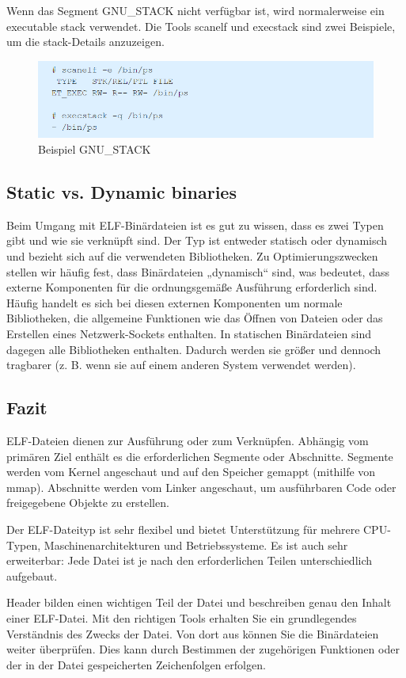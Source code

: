 Wenn das Segment GNU\_STACK nicht verfügbar ist, wird normalerweise ein executable stack verwendet.
Die Tools scanelf und execstack sind zwei Beispiele, um die stack-Details anzuzeigen.

\begin{figure}[H]
    \begin{center}
        \includegraphics[scale=1]{images/example_gnustack.png}
        \caption{Beispiel GNU\_STACK \cite{example_gnustack}}
    \end{center}
\end{figure}

\subsection{Static vs. Dynamic binaries}
Beim Umgang mit ELF-Binärdateien ist es gut zu wissen, dass es zwei Typen gibt und wie sie verknüpft sind. Der Typ ist entweder statisch oder dynamisch und bezieht sich auf die verwendeten Bibliotheken. Zu Optimierungszwecken stellen wir häufig fest, dass Binärdateien „dynamisch“ sind, was bedeutet, dass externe Komponenten für die ordnungsgemäße Ausführung erforderlich sind. Häufig handelt es sich bei diesen externen Komponenten um normale Bibliotheken, die allgemeine Funktionen wie das Öffnen von Dateien oder das Erstellen eines Netzwerk-Sockets enthalten. In statischen Binärdateien sind dagegen alle Bibliotheken enthalten. Dadurch werden sie größer und dennoch tragbarer (z. B. wenn sie auf einem anderen System verwendet werden).

\subsection{Fazit}
ELF-Dateien dienen zur Ausführung oder zum Verknüpfen. Abhängig vom primären Ziel enthält es die erforderlichen Segmente oder Abschnitte. Segmente werden vom Kernel angeschaut und auf den Speicher gemappt (mithilfe von mmap). Abschnitte werden vom Linker angeschaut, um ausführbaren Code oder freigegebene Objekte zu erstellen.

Der ELF-Dateityp ist sehr flexibel und bietet Unterstützung für mehrere CPU-Typen, Maschinenarchitekturen und Betriebssysteme. Es ist auch sehr erweiterbar: Jede Datei ist je nach den erforderlichen Teilen unterschiedlich aufgebaut.

Header bilden einen wichtigen Teil der Datei und beschreiben genau den Inhalt einer ELF-Datei. Mit den richtigen Tools erhalten Sie ein grundlegendes Verständnis des Zwecks der Datei. Von dort aus können Sie die Binärdateien weiter überprüfen. Dies kann durch Bestimmen der zugehörigen Funktionen oder der in der Datei gespeicherten Zeichenfolgen erfolgen.